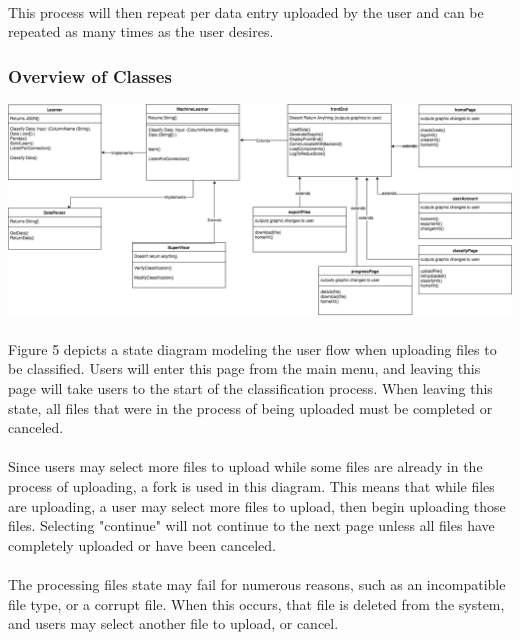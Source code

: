 \documentclass[12pt,oneside,letterpaper]{article}
\begin{document}
\paragraph{} This process will then repeat per data entry uploaded by the user and can be repeated as many times as the user desires.

\subsubsection{Overview of Classes}
\includegraphics[scale = 0.3]{YarmClassDiagram.png}
\begingroup
{}
\endgroup

\paragraph{} Figure 5 depicts a state diagram modeling the user flow when uploading files to be classified. Users will enter this page from the main menu, and leaving this page will take users to the start of the classification process. When leaving this state, all files that were in the process of being uploaded must be completed or canceled.
\paragraph{} Since users may select more files to upload while some files are already in the process of uploading, a fork is used in this diagram. This means that while files are uploading, a user may select more files to upload, then begin uploading those files. Selecting "continue" will not continue to the next page unless all files have completely uploaded or have been canceled.
\paragraph{} The processing files state may fail for numerous reasons, such as an incompatible file type, or a corrupt file. When this occurs, that file is deleted from the system, and users may select another file to upload, or cancel.
\end{document}

